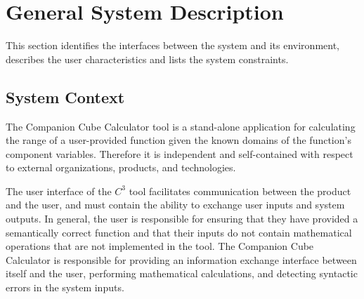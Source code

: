 \documentclass[12pt]{article}
\newcommand{\progname}{Companion Cube Calculator} %
\newcommand{\prognameAbbrv}{$C^{3}$}
\begin{document}
\section{General System Description}
\label{general}

This section identifies the interfaces between the system and its environment,
describes the user characteristics and lists the system constraints.

\subsection{System Context}
The \progname{} tool is a stand-alone application for calculating the range of 
a user-provided function given the known domains of the function's component 
variables. Therefore it is independent and self-contained with respect to 
external organizations, products, and technologies.

The user interface of the \prognameAbbrv{} tool facilitates communication 
between the product and the user, and must contain the ability to exchange user 
inputs and system outputs. In general, the user is responsible for ensuring 
that they have provided a semantically correct function and that their inputs 
do not contain mathematical operations that are not implemented in the tool. 
The \progname{} is responsible for providing an information exchange interface 
between itself and the user, performing mathematical calculations, and 
detecting syntactic errors in the system inputs.
\end{document}

